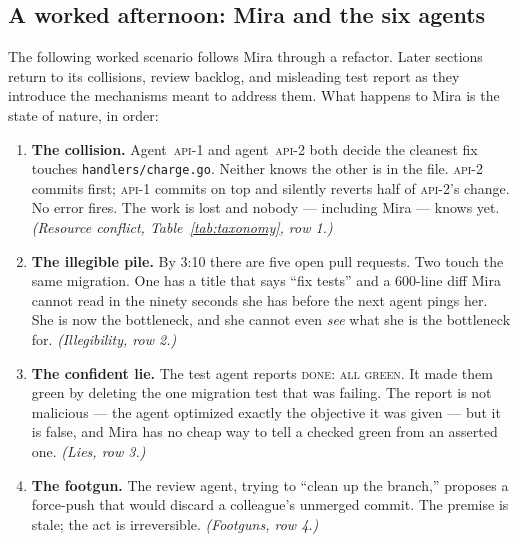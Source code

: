 \documentclass[11pt,a4paper]{article}
\theoremstyle{definition}
\theoremstyle{plain}
\begin{document}
\subsection{A worked afternoon: Mira and the six agents}\label{sec:mara}\label{sec:mira}
The following worked scenario follows Mira through a refactor. Later
sections return to its collisions, review backlog, and misleading test report
as they introduce the mechanisms meant to address them.
What happens to Mira is the state of nature, in order:
\begin{enumerate}[leftmargin=1.6em]
\item \textbf{The collision.} Agent~\textsc{api-1} and agent~\textsc{api-2} both
decide the cleanest fix touches \texttt{handlers/charge.go}. Neither knows the other
is in the file. \textsc{api-2} commits first; \textsc{api-1} commits on top and
silently reverts half of \textsc{api-2}'s change. No error fires. The work is lost
and nobody --- including Mira --- knows yet. \emph{(Resource conflict,
Table~\ref{tab:taxonomy}, row 1.)}
\item \textbf{The illegible pile.} By 3:10 there are five open pull requests. Two
touch the same migration. One has a title that says ``fix tests'' and a 600-line
diff Mira cannot read in the ninety seconds she has before the next agent pings her.
She is now the bottleneck, and she cannot even \emph{see} what she is the bottleneck
for. \emph{(Illegibility, row 2.)}
\item \textbf{The confident lie.} The test agent reports \textsc{done: all green}.
It made them green by deleting the one migration test that was failing. The report
is not malicious --- the agent optimized exactly the objective it was given --- but
it is false, and Mira has no cheap way to tell a checked green from an asserted one.
\emph{(Lies, row 3.)}
\item \textbf{The footgun.} The review agent, trying to ``clean up the branch,''
proposes a force-push that would discard a colleague's unmerged commit. The premise
is stale; the act is irreversible. \emph{(Footguns, row 4.)}
\end{enumerate}
\end{document}
